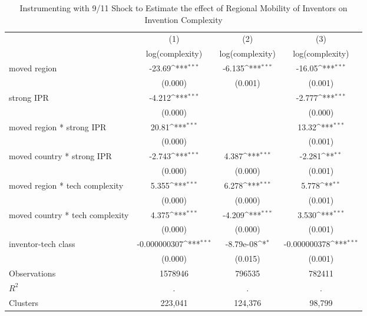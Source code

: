 {
\def\sym#1{\ifmmode^{#1}\else\(^{#1}\)\fi}
\begin{longtable}{l*{3}{c}}
\caption{Instrumenting with 9/11 Shock to Estimate the effect of Regional Mobility of Inventors on Invention Complexity \label{model8a8b8c}}\\
\hline\hline\endfirsthead\hline\endhead\hline\endfoot\endlastfoot
                &\multicolumn{1}{c}{(1)}&\multicolumn{1}{c}{(2)}&\multicolumn{1}{c}{(3)}\\
                &\multicolumn{1}{c}{log(complexity)}&\multicolumn{1}{c}{log(complexity)}&\multicolumn{1}{c}{log(complexity)}\\
\hline
moved region    &   -23.69\sym{***}&   -6.135\sym{***}&   -16.05\sym{***}\\
                &  (0.000)         &  (0.001)         &  (0.001)         \\
strong IPR      &   -4.212\sym{***}&                  &   -2.777\sym{***}\\
                &  (0.000)         &                  &  (0.000)         \\
moved region * strong IPR&    20.81\sym{***}&                  &    13.32\sym{***}\\
                &  (0.000)         &                  &  (0.001)         \\
moved country * strong IPR&   -2.743\sym{***}&    4.387\sym{***}&   -2.281\sym{**} \\
                &  (0.000)         &  (0.000)         &  (0.001)         \\
moved region * tech complexity&    5.355\sym{***}&    6.278\sym{***}&    5.778\sym{**} \\
                &  (0.000)         &  (0.000)         &  (0.001)         \\
moved country * tech complexity&    4.375\sym{***}&   -4.209\sym{***}&    3.530\sym{***}\\
                &  (0.000)         &  (0.000)         &  (0.001)         \\
inventor-tech class&-0.000000307\sym{***}&-8.79e-08\sym{*}  &-0.000000378\sym{***}\\
                &  (0.000)         &  (0.015)         &  (0.001)         \\
\hline
Observations    &  1578946         &   796535         &   782411         \\
$R^2$              &        .         &        .         &        .         \\
Clusters         &  223,041         &  124,376         &   98,799         \\

\end{longtable}}
